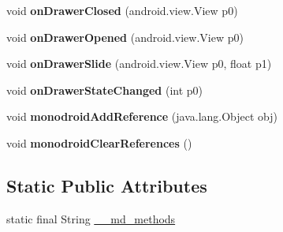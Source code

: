 \begin{DoxyCompactItemize}
void {\bfseries on\+Drawer\+Closed} (android.\+view.\+View p0)
\item 
\mbox{\label{classmd5b60ffeb829f638581ab2bb9b1a7f4f3f_1_1MasterDetailRenderer_a0e1ff8ec8ec5e237bd9237919be3bf13}} 
void {\bfseries on\+Drawer\+Opened} (android.\+view.\+View p0)
\item 
\mbox{\label{classmd5b60ffeb829f638581ab2bb9b1a7f4f3f_1_1MasterDetailRenderer_a90e6dc6e5a16837cc5e5a625bfd14ba1}} 
void {\bfseries on\+Drawer\+Slide} (android.\+view.\+View p0, float p1)
\item 
\mbox{\label{classmd5b60ffeb829f638581ab2bb9b1a7f4f3f_1_1MasterDetailRenderer_a076e7cfc3b531dbbb5ee5136cc89b3c2}} 
void {\bfseries on\+Drawer\+State\+Changed} (int p0)
\item 
\mbox{\label{classmd5b60ffeb829f638581ab2bb9b1a7f4f3f_1_1MasterDetailRenderer_a8ce806f10f46d2c5af92ef0c1b51986d}} 
void {\bfseries monodroid\+Add\+Reference} (java.\+lang.\+Object obj)
\item 
\mbox{\label{classmd5b60ffeb829f638581ab2bb9b1a7f4f3f_1_1MasterDetailRenderer_a4889caabc4556324a01473ea7ae71ecb}} 
void {\bfseries monodroid\+Clear\+References} ()
\end{DoxyCompactItemize}
\subsection*{Static Public Attributes}
\begin{DoxyCompactItemize}
\item 
static final String \hyperlink{classmd5b60ffeb829f638581ab2bb9b1a7f4f3f_1_1MasterDetailRenderer_ace7bfaacfb9e54f304255e32cc2b83de}{\+\_\+\+\_\+md\+\_\+methods}
\end{DoxyCompactItemize}
